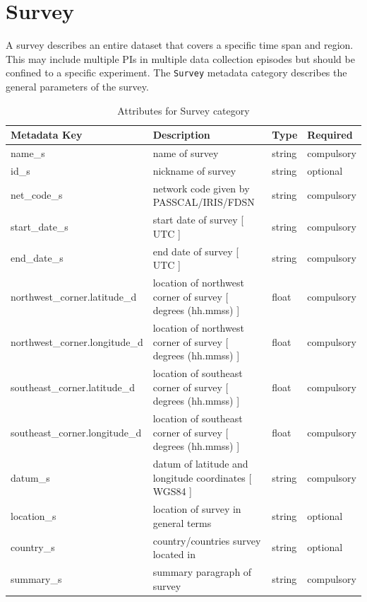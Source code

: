 \documentclass{article}
\begin{document}
\newpage
\section{Survey}

A survey describes an entire dataset that covers a specific time span and region. This may include multiple PIs in multiple data collection episodes but should be confined to a specific experiment. The \verb|Survey| metadata category describes the general parameters of the survey.

\begin{table}[htb!]
	\caption[Attributes for Survey]{Attributes for Survey category}
	\begin{tabular}{|l|l|l|l|}
		\hline
		\textbf{Metadata Key} & \textbf{Description} & \textbf{Type} & \textbf{Required} \\ \hline
		name\_s & name of survey & string & compulsory \\ \hline
		id\_s & nickname of survey & string & optional \\ \hline
		net\_code\_s & network code given by PASSCAL/IRIS/FDSN & string & compulsory \\ \hline
		start\_date\_s & start date of survey [ UTC ] & string & compulsory \\ \hline
		end\_date\_s & end date of survey [ UTC ] & string & compulsory \\ \hline
		northwest\_corner.latitude\_d & location of northwest corner of survey [ degrees (hh.mmss) ] & float & compulsory \\ \hline
		northwest\_corner.longitude\_d & location of northwest corner of survey [ degrees (hh.mmss) ] & float & compulsory \\ \hline
		southeast\_corner.latitude\_d & location of southeast corner of survey  [ degrees (hh.mmss) ] & float & compulsory \\ \hline
		southeast\_corner.longitude\_d & location of southeast corner of survey  [ degrees (hh.mmss) ] & float & compulsory \\ \hline
		datum\_s & datum of latitude and longitude coordinates [ WGS84 ] & string & compulsory \\ \hline
		location\_s & location of survey in general terms & string & optional \\ \hline
		country\_s & country/countries survey located in & string & optional \\ \hline
		summary\_s & summary paragraph of survey & string & compulsory \\ \hline

\end{tabular}
\end{table}
\end{document}

